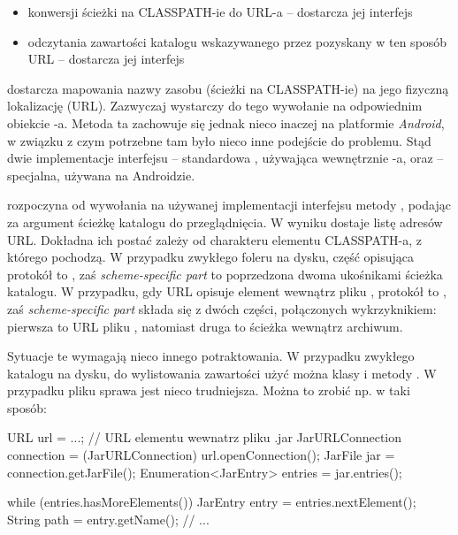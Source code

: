 \begin{itemize}
  
  \item{konwersji ścieżki na CLASSPATH-ie do URL-a} -- dostarcza jej interfejs

  \item{odczytania zawartości katalogu wskazywanego przez pozyskany w ten sposób URL} -- dostarcza
    jej interfejs 

\end{itemize}


 dostarcza mapowania nazwy zasobu (ścieżki na CLASSPATH-ie) na jego fizyczną
lokalizację (URL). Zazwyczaj wystarczy do tego wywołanie  na odpowiednim obiekcie
-a. Metoda ta zachowuje się jednak nieco inaczej na platformie \emph{Android}, w
związku z czym potrzebne tam było nieco inne podejście do problemu. Stąd dwie implementacje
interfejsu  -- standardowa , używająca wewnętrznie
-a, oraz  -- specjalna, używana na Androidzie.

 rozpoczyna od wywołania na używanej implementacji interfejsu
 metody , podając za argument ścieżkę katalogu do
przeglądnięcia. W wyniku dostaje listę adresów URL. Dokładna ich postać zależy od charakteru
elementu CLASSPATH-a, z którego pochodzą. W przypadku zwykłego foleru na dysku, część opisująca
protokół to , zaś \textit{scheme-specific part} to poprzedzona dwoma ukośnikami ścieżka
katalogu. W przypadku, gdy URL opisuje element wewnątrz pliku , protokół to ,
zaś \textit{scheme-specific part} składa się z dwóch części, połączonych wykrzyknikiem: pierwsza to
URL pliku , natomiast druga to ścieżka wewnątrz archiwum. 

Sytuacje te wymagają nieco innego potraktowania. W przypadku zwykłego katalogu na dysku,
do wylistowania zawartości użyć można klasy  i metody . W przypadku pliku
 sprawa jest nieco trudniejsza. Można to zrobić np. w taki sposób:

\begin{java}
URL url = ...; // URL elementu wewnatrz pliku .jar
JarURLConnection connection = (JarURLConnection) url.openConnection();
JarFile jar = connection.getJarFile();
Enumeration<JarEntry> entries = jar.entries();

while (entries.hasMoreElements()) {
    JarEntry entry = entries.nextElement();
    String path = entry.getName();
    // ...
}
\end{java}

